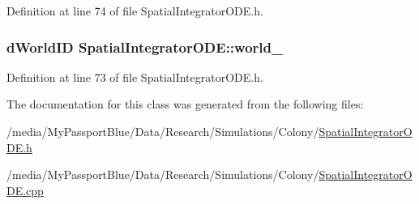 \-Definition at line 74 of file \-Spatial\-Integrator\-O\-D\-E.\-h.

\hypertarget{class_spatial_integrator_o_d_e_ae520b605f7c9733f5676297c28a2af3e}{
\subsubsection[{world\-\_\-}]{\setlength{\rightskip}{0pt plus 5cm}d\-World\-I\-D {\bf \-Spatial\-Integrator\-O\-D\-E\-::world\-\_\-}}}\label{class_spatial_integrator_o_d_e_ae520b605f7c9733f5676297c28a2af3e}


\-Definition at line 73 of file \-Spatial\-Integrator\-O\-D\-E.\-h.



\-The documentation for this class was generated from the following files\-:\begin{DoxyCompactItemize}
\item 
/media/\-My\-Passport\-Blue/\-Data/\-Research/\-Simulations/\-Colony/\hyperlink{_spatial_integrator_o_d_e_8h}{\-Spatial\-Integrator\-O\-D\-E.\-h}\item 
/media/\-My\-Passport\-Blue/\-Data/\-Research/\-Simulations/\-Colony/\hyperlink{_spatial_integrator_o_d_e_8cpp}{\-Spatial\-Integrator\-O\-D\-E.\-cpp}\end{DoxyCompactItemize}
